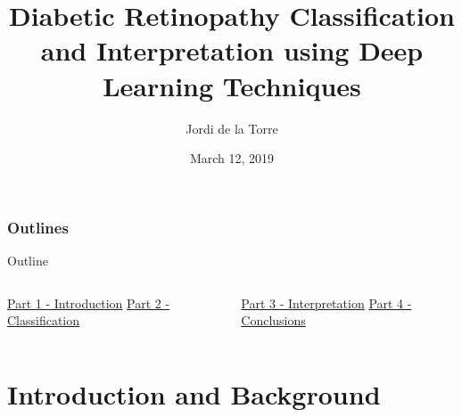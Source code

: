 \documentclass{beamer}
\title[Ph.D. Thesis Presentation]{Diabetic Retinopathy Classification and Interpretation using Deep Learning Techniques}
\author{Jordi de la Torre} %
\institute[URV] %
{
  Doctorate Program of Computer Science and Mathematics of Security\\
  Supervisors: Dra. A\"ida Valls and Dr. Dom\`enec Puig\\
  Universitat Rovira i Virgili}
\date{March 12, 2019}
\begin{document}
\begin{frame}
  \titlepage
\end{frame}

\section*{Outlines}

\begin{frame}{Outline}
\begin{columns}
	\begin{column}{0.5\textwidth}
		\underline{Part 1 - Introduction}
		\tableofcontents[part={1},hideothersubsections]
		\hfill \break
		\underline{Part 2 - Classification}
		\tableofcontents[part={2},hideothersubsections]
	\end{column}
	\begin{column}{0.5\textwidth}
		\underline{Part 3 - Interpretation}
		\tableofcontents[part={3},hideothersubsections]
		\hfill \break
		\underline{Part 4 - Conclusions}
		\tableofcontents[part={4},hideothersubsections]
	\end{column}
\end{columns}
\end{frame}


\part{Introduction and Background}
\end{document}
